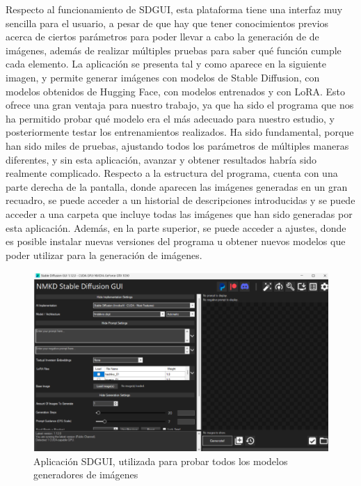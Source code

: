  Respecto al funcionamiento de SDGUI, esta plataforma tiene una interfaz muy sencilla para el usuario, a pesar de que hay que tener conocimientos previos acerca de ciertos parámetros para poder llevar a cabo la generación de de imágenes, además de realizar múltiples pruebas para saber qué función cumple cada elemento. La aplicación se presenta tal y como aparece en la siguiente imagen, y permite generar imágenes con modelos de Stable Diffusion, con modelos obtenidos de Hugging Face, con modelos entrenados y con LoRA. Esto ofrece una gran ventaja para nuestro trabajo, ya que ha sido el programa que nos ha permitido probar qué modelo era el más adecuado para nuestro estudio, y posteriormente testar los entrenamientos realizados. Ha sido fundamental, porque han sido miles de pruebas, ajustando todos los parámetros de múltiples maneras diferentes, y sin esta aplicación, avanzar y obtener resultados habría sido realmente complicado. Respecto a la estructura del programa, cuenta con una parte derecha de la pantalla, donde aparecen las imágenes generadas en un gran recuadro, se puede acceder a un historial de descripciones introducidas y se puede acceder a una carpeta que incluye todas las imágenes que han sido generadas por esta aplicación. Además, en la parte superior, se puede acceder a ajustes, donde es posible instalar nuevas versiones del programa u obtener nuevos modelos que poder utilizar para la generación de imágenes. \\
 
 
 \begin{figure}[h]
 	\centering
 	\includegraphics[width = 1
 	\textwidth]{Imagenes/Vectorial/nmkdsdgui.png}
 	\caption{Aplicación SDGUI, utilizada para probar todos los modelos generadores de imágenes }
 	\label{fig:nmkdsdgui}
 \end{figure}
 

